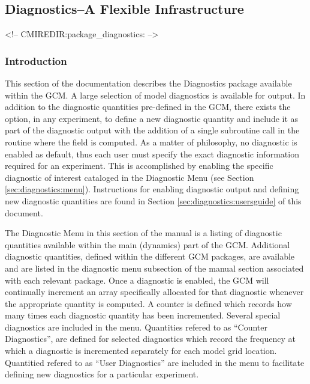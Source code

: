 \subsection{Diagnostics--A Flexible Infrastructure}
\label{sec:pkg:diagnostics}
\begin{rawhtml}
<!-- CMIREDIR:package_diagnostics: -->
\end{rawhtml}

\subsubsection{Introduction}

\noindent
This section of the documentation describes the Diagnostics package available within 
the GCM.  A large selection of model diagnostics is available for output.  
In addition to the diagnostic quantities pre-defined in the GCM, there exists
the option, in any experiment, to define a new diagnostic quantity and include it
as part of the diagnostic output with the addition of a single subroutine call in the
routine where the field is computed. As a matter of philosophy, no diagnostic is enabled 
as default, thus each user must specify the exact diagnostic information required for an 
experiment.  This is accomplished by enabling the specific diagnostic of interest cataloged 
in the Diagnostic Menu (see Section \ref{sec:diagnostics:menu}). Instructions for enabling
diagnostic output and defining new diagnostic quantities are found in Section 
\ref{sec:diagnostics:usersguide} of this document.

\noindent
The Diagnostic Menu in this section of the manual is a listing of diagnostic quantities available 
within the main (dynamics) part of the GCM. Additional diagnostic quantities, defined within the
different GCM packages, are available and are listed in the diagnostic menu subsection of 
the manual section associated with each relevant package. Once a diagnostic is enabled, the 
GCM will continually increment an array specifically allocated for that diagnostic whenever the 
appropriate quantity is computed.  A counter is defined which records how many times each diagnostic 
quantity has been incremented.  Several special diagnostics are included in the menu. Quantities 
refered to as ``Counter Diagnostics'', are defined for selected diagnostics which record the 
frequency at which a diagnostic is incremented separately for each model grid location.
Quantitied refered to as ``User Diagnostics'' are included in the menu to facilitate
defining new diagnostics for a particular experiment.

